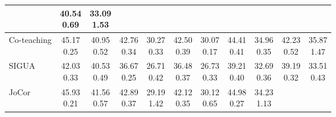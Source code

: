 \documentclass[11pt]{article}
\begin{document}
\begin{table}[!htbp]
\begin{tabular}{l |cc|cc|cc|cc|cc}
			& \makecell{40.54\\ \scriptsize{0.69}}
			& \makecell{33.09\\ \scriptsize{1.53}}\\
			\hline
			Co-teaching & \makecell{45.17\\ \scriptsize{0.25}}
			&\makecell{40.95\\ \scriptsize{0.52}}
			&\makecell{42.76\\ \scriptsize{0.34}}
			&\makecell{30.27\\ \scriptsize{0.33}}
			&\makecell{42.50\\ \scriptsize{0.39}}
			&\makecell{30.07\\ \scriptsize{0.17}}
			&\makecell{44.41\\ \scriptsize{0.41}}
			&\makecell{34.96\\ \scriptsize{0.35}}
			&\makecell{42.23\\ \scriptsize{0.52}}
			&\makecell{35.87\\ \scriptsize{1.47}}\\
			\hline	
			SIGUA & \makecell{42.03\\ \scriptsize{0.33}}
			& \makecell{40.53\\ \scriptsize{0.49}}
			& \makecell{36.67\\ \scriptsize{0.25}}
			& \makecell{26.71\\ \scriptsize{0.42}}
			& \makecell{36.48\\ \scriptsize{0.37}}
			& \makecell{26.73\\ \scriptsize{0.33}}
			& \makecell{39.21\\ \scriptsize{0.40}}
			& \makecell{32.69\\ \scriptsize{0.36}}
			& \makecell{39.19\\ \scriptsize{0.32}}
			& \makecell{33.51\\ \scriptsize{0.43}}\\\hline
			JoCor& \makecell{45.93\\ \scriptsize{0.21}} 
			& \makecell{41.56\\ \scriptsize{0.57}}
			& \makecell{42.89\\ \scriptsize{0.37}}
			& \makecell{29.19\\ \scriptsize{1.42}}
			& \makecell{42.12\\ \scriptsize{0.35}}
			& \makecell{30.12\\ \scriptsize{0.65}}
			& \makecell{44.98\\ \scriptsize{0.27}}
			& \makecell{34.23\\ \scriptsize{1.13}}

\end{tabular}
\end{table}
\end{document}
